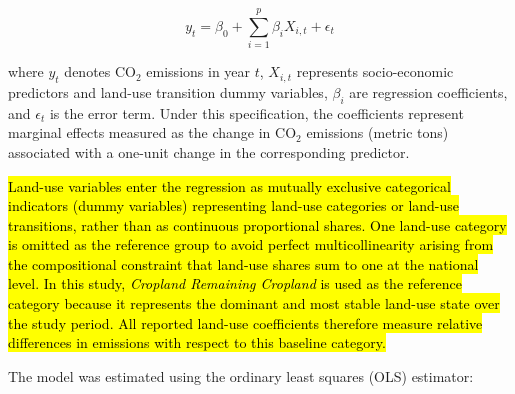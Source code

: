 \documentclass[10pt,letterpaper]{article}
\begin{document}
\begin{equation}
	y_t = \beta_0 + \sum_{i=1}^{p} \beta_i X_{i,t} + \epsilon_t
\end{equation}

where $y_t$ denotes CO$_2$ emissions in year $t$, $X_{i,t}$ represents socio-economic predictors and land-use transition dummy variables, $\beta_i$ are regression coefficients, and $\epsilon_t$ is the error term. Under this specification, the coefficients represent marginal effects measured as the change in CO$_2$ emissions (metric tons) associated with a one-unit change in the corresponding predictor. 

%
%
\hl{Land-use variables enter the regression as mutually exclusive categorical indicators (dummy variables) representing land-use categories or land-use transitions, rather than as continuous proportional shares. One land-use category is omitted as the reference group to avoid perfect multicollinearity arising from the compositional constraint that land-use shares sum to one at the national level. In this study, \textit{Cropland Remaining Cropland} is used as the reference category because it represents the dominant and most stable land-use state over the study period. All reported land-use coefficients therefore measure relative differences in emissions with respect to this baseline category.}

The model was estimated using the ordinary least squares (OLS) estimator:
\end{document}
